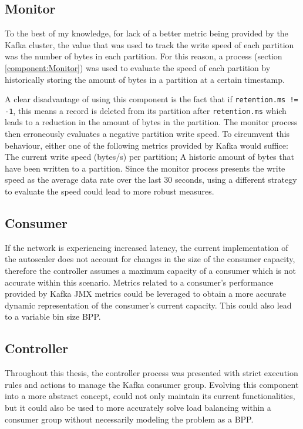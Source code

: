 \subsection{Monitor}

To the best of my knowledge, for lack of a better metric being provided by the
Kafka cluster, the value that was used to track the write speed of each
partition was the number of bytes in each partition. For this reason, a process
(section \ref{component:Monitor}) was used to evaluate the speed of each partition by
historically storing the amount of bytes in a partition at a certain timestamp.

A clear disadvantage of using this component is the fact that if
\lstinline{retention.ms != -1}, this means a record is deleted from its
partition after \lstinline{retention.ms} which leads to a reduction in the
amount of bytes in the partition. The monitor process then erroneously evaluates
a negative partition write speed. To circumvent this behaviour, either one of
the following metrics provided by Kafka would suffice: The current write speed
(bytes/s) per partition; A historic amount of bytes that have been written to a
partition. Since the monitor process presents the write speed as the average
data rate over the last 30 seconds, using a different strategy to evaluate the
speed could lead to more robust measures.

\subsection{Consumer}

If the network is experiencing increased latency, the current implementation of
the autoscaler does not account for changes in the size of the consumer
capacity, therefore the controller assumes a maximum capacity of a consumer
which is not accurate within this scenario. Metrics related to a consumer's
performance provided by Kafka JMX metrics could be leveraged to obtain a more
accurate dynamic representation of the consumer's current capacity. This could
also lead to a variable bin size BPP.

\subsection{Controller}

Throughout this thesis, the controller process was presented with strict
execution rules and actions to manage the Kafka consumer group. Evolving this
component into a more abstract concept, could not only maintain its current
functionalities, but it could also be used to more accurately solve load
balancing within a consumer group without necessarily modeling the problem as a
BPP. 

